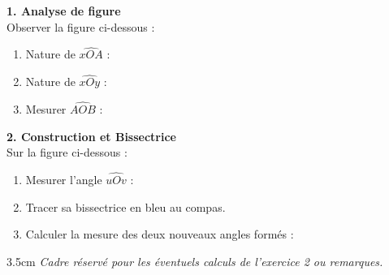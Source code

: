 \documentclass[a4paper]{book}
\begin{document}
    \begin{exercice}
        \begin{minipage}[t]{0.48\textwidth}
            \textbf{1. Analyse de figure} \\
            Observer la figure ci-dessous :
            \begin{center}
            \end{center}
            \begin{enumerate}
                \item Nature de $\widehat{xOA}$ : \points[3]

                \medskip
                
                \item Nature de $\widehat{xOy}$ : \points[3]

                \medskip
                
                \item Mesurer $\widehat{AOB}$ : \points[2]
            \end{enumerate}
        \end{minipage}
        \hfill
        \vrule
        \hfill
        \begin{minipage}[t]{0.48\textwidth}
            \textbf{2. Construction et Bissectrice} \\
            Sur la figure ci-dessous :
            \begin{enumerate}
                \item Mesurer l'angle $\widehat{uOv}$ : \points[2]
                \item Tracer sa bissectrice en bleu au compas.
                \item Calculer la mesure des deux nouveaux angles formés :
                \points[10]
            \end{enumerate}
            \begin{center}
            \end{center}
        \end{minipage}
    \end{exercice}
    
    \begin{ZoneReponse}{3.5cm}
        \centering \textit{\small Cadre réservé pour les éventuels calculs de l'exercice 2 ou remarques.}
    \end{ZoneReponse}
    
\end{document}
